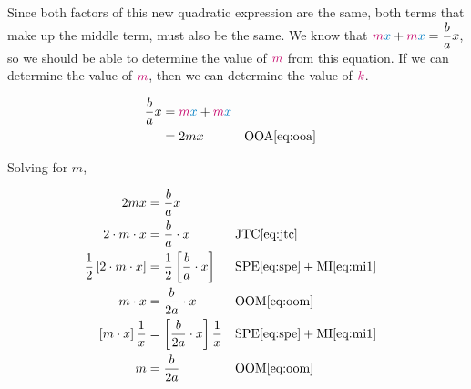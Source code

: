
Since both factors of this new quadratic expression are the same, both terms that make up the middle term,  must also be the same.  We know that ${\color{stockholmPink}m}{\color{stockholmBlue}x} + {\color{stockholmPink}m}{\color{stockholmBlue}x}=\dfrac{b}{a}x$, so we should be able to determine the value of ${\color{stockholmPink}m}$ from this equation.    If we can determine the value of ${\color{stockholmPink}m}$, then we can determine the value of  ${\color{stockholmPink}k}$.

\begin{align*}
\dfrac{b}{a}x 	& = \textcolor{stockholmPink}{m}\textcolor{stockholmBlue}{x} + \textcolor{stockholmPink}{m}\textcolor{stockholmBlue}{x}\\
		& = 2mx && \text{OOA} \eqref{eq:ooa} \\
\end{align*}

Solving for $m$,

\begin{align*}
2mx & = \dfrac{b}{a}x \\
2 \cdot m \cdot x &= \dfrac{b}{a} \cdot x  && \text{JTC} \eqref{eq:jtc} \\
\dfrac{1}{2} \left[2 \cdot m \cdot x \right] &= \dfrac{1}{2} \left[\dfrac{b}{a} \cdot x \right]  && \text{SPE} \eqref{eq:spe} + \text{MI} \eqref{eq:mi1} \\
m \cdot  x &= \dfrac{b}{2a} \cdot x  && \text{OOM} \eqref{eq:oom} \\
\left[m \cdot x \right]\dfrac{1}{x}  &= \left[\dfrac{b}{2a}  \cdot x\right] \dfrac{1}{x}  && \text{SPE} \eqref{eq:spe} + \text{MI} \eqref{eq:mi1} \\
m &= \dfrac{b}{2a}  && \text{OOM} \eqref{eq:oom} 
\end{align*}


